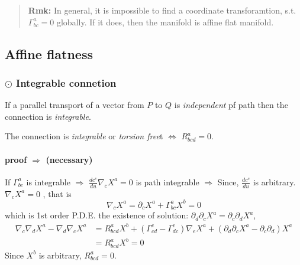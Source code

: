 \begin{quote}
	\textbf{Rmk:}
In general, it is impossible to find a coordinate transforamtion, s.t. $\Gamma^{a}_{bc} = 0$ globally. If it does, then the manifold is affine flat manifold.
\end{quote}

\subsection{Affine flatness} %

\subsubsection{$\odot$ Integrable connetion} %


If a parallel transport of a vector from $P$ to $Q$ is \textit{independent} pf path then the connection is \textit{integrable}.


The connection is \textit{integrable} or \textit{torsion free}t $\Longleftrightarrow$  $R^{a}_{bcd} = 0$.

\paragraph{proof $\Rightarrow$ (necessary)} %

If $\Gamma^{a}_{bc}$ is integrable $\Rightarrow$ $\displaystyle \frac{dc^{c}}{du} \nabla_{c} X^{a} = 0$ is path integrable $\Rightarrow$ Since, $\displaystyle \frac{dc^{c}}{du}$ is arbitrary. $\nabla_cX^{a}=0$ , that is 
\begin{equation}
\nabla_{c} X^{a} = \partial_{c} X^{a} + \Gamma^{a}_{bc} X^{b} = 0
\end{equation}
which is 1st order P.D.E. the existence of solution: $\partial_{d}\partial_{c}X^{a} = \partial_{c}\partial_{d}X^{a}$, 
\begin{equation}
\begin{aligned}
\nabla_{c}\nabla_{d} X^{a} - \nabla_{d}\nabla_{c} X^{a}
&= R^{a}_{bcd} X^{b} + \left(\Gamma^{e}_{cd} - \Gamma^{e}_{dc}\right)\nabla_{e}X^{a} + \left(\partial_{d}\partial_{c}X^{a} - \partial_{c}\partial_{d}\right)X^{a}\\
&= R^{a}_{bcd} X^{b} = 0
\end{aligned}
\end{equation}
Since $X^{b}$ is arbitrary, $R^{a}_{bcd} = 0$.

